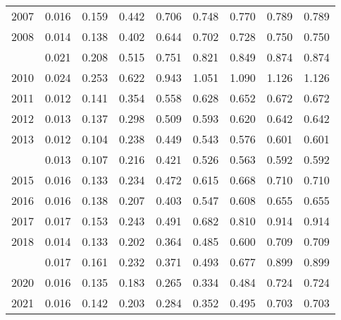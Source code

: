 \documentclass[
]{article}
\begin{document}
\begin{longtable}[t]{lrrrrrrrr}
2007 & 0.016 & 0.159 & 0.442 & 0.706 & 0.748 & 0.770 & 0.789 & 0.789\\
2008 & 0.014 & 0.138 & 0.402 & 0.644 & 0.702 & 0.728 & 0.750 & 0.750\\
\addlinespace
2009 & 0.021 & 0.208 & 0.515 & 0.751 & 0.821 & 0.849 & 0.874 & 0.874\\
2010 & 0.024 & 0.253 & 0.622 & 0.943 & 1.051 & 1.090 & 1.126 & 1.126\\
2011 & 0.012 & 0.141 & 0.354 & 0.558 & 0.628 & 0.652 & 0.672 & 0.672\\
2012 & 0.013 & 0.137 & 0.298 & 0.509 & 0.593 & 0.620 & 0.642 & 0.642\\
2013 & 0.012 & 0.104 & 0.238 & 0.449 & 0.543 & 0.576 & 0.601 & 0.601\\
\addlinespace
2014 & 0.013 & 0.107 & 0.216 & 0.421 & 0.526 & 0.563 & 0.592 & 0.592\\
2015 & 0.016 & 0.133 & 0.234 & 0.472 & 0.615 & 0.668 & 0.710 & 0.710\\
2016 & 0.016 & 0.138 & 0.207 & 0.403 & 0.547 & 0.608 & 0.655 & 0.655\\
2017 & 0.017 & 0.153 & 0.243 & 0.491 & 0.682 & 0.810 & 0.914 & 0.914\\
2018 & 0.014 & 0.133 & 0.202 & 0.364 & 0.485 & 0.600 & 0.709 & 0.709\\
\addlinespace
2019 & 0.017 & 0.161 & 0.232 & 0.371 & 0.493 & 0.677 & 0.899 & 0.899\\
2020 & 0.016 & 0.135 & 0.183 & 0.265 & 0.334 & 0.484 & 0.724 & 0.724\\
2021 & 0.016 & 0.142 & 0.203 & 0.284 & 0.352 & 0.495 & 0.703 & 0.703\\*
\end{longtable}
\end{document}
